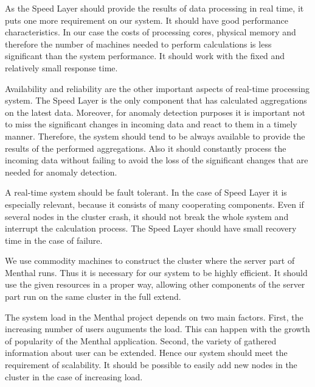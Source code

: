 As the Speed Layer should provide the results of data processing in real time, it puts one more requirement on our system.
It should have good performance characteristics.
In our case the costs of processing cores, physical memory and therefore the number of machines needed to perform calculations is less significant than the system performance.
It should work with the fixed and relatively small response time. 

Availability and reliability are the other important aspects of real-time processing system.
The Speed Layer is the only component that has calculated aggregations on the latest data.
Moreover, for anomaly detection purposes it is important not to miss the significant changes in incoming data and react to them in a timely manner.
Therefore, the system should tend to be always available to provide the results of the performed aggregations.
Also it should constantly process the incoming data without failing to avoid the loss of the significant changes that are needed for anomaly detection. 

A real-time system should be fault tolerant.
In the case of Speed Layer it is especially relevant, because it consists of many cooperating components.
Even if several nodes in the cluster crash, it should not break the whole system and interrupt the calculation process.
The Speed Layer should have small recovery time in the case of failure. 

We use commodity machines to construct the cluster where the server part of Menthal runs.
Thus it is necessary for our system to be highly efficient.
It should use the given resources in a proper way, allowing other components of the server part run on the same cluster in the full extend.

The system load in the Menthal project depends on two main factors.
First, the increasing number of users auguments the load.
This can happen with the growth of popularity of the Menthal application.
Second, the variety of gathered information about user can be extended.
Hence our system should meet the requirement of scalability.
It should be possible to easily add new nodes in the cluster in the case of increasing load.  

